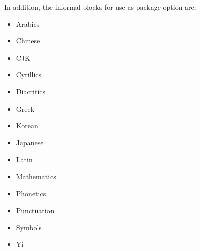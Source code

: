 ﻿\documentclass{article}
\newenvironment{itemlist}{%
  \begin{itemize}
	\setlength{\itemsep}{0pt}
	\setlength{\parsep}{0pt}
	\setlength{\topsep}{0pt}
	\setlength{\partopsep}{0pt}
	\setlength{\parskip}{0pt}
	\setlength{\labelsep}{5pt}}%
{
  \end{itemize}}
\begin{document}
		In addition, the informal blocks for use as package option are:
		
		\begin{itemlist}
			\item Arabics
			\item Chinese
			\item CJK
			\item Cyrillics
			\item Diacritics
			\item Greek
			\item Korean
			\item Japanese
			\item Latin
			\item Mathematics
			\item Phonetics
			\item Punctuation
			\item Symbols
			\item Yi
		\end{itemlist}
			
\end{document}
